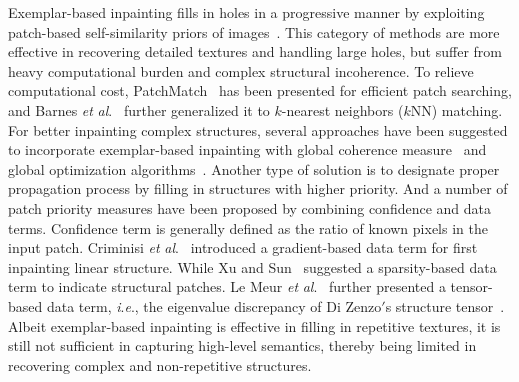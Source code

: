 \documentclass[10pt,journal,compsoc]{IEEEtran}
\newcommand{\ie}{\textit{i}.\textit{e}.}
\newcommand{\etal}{\textit{et} \textit{al}.}
\begin{document}
%


Exemplar-based inpainting fills in holes in a progressive manner by exploiting patch-based self-similarity priors of images~\cite{criminisi2004region,Efros1999iccv}.
%
This category of methods are more effective in recovering detailed textures and handling large holes, but suffer from heavy computational burden and complex structural incoherence.
%
To relieve computational cost, PatchMatch~\cite{Barnes:2009:PAR} has been presented for efficient patch searching, and Barnes \etal~\cite{Barnes2010eccv} further generalized it to $k$-nearest neighbors ($k$NN) matching.
%
%
%
For better inpainting complex structures, several approaches have been suggested to incorporate exemplar-based inpainting with global coherence measure~\cite{wexler2004cvpr,he2012eccv} and global optimization algorithms~\cite{KomodakisPriority,pritch2009iccv}.
%
Another type of solution is to designate proper propagation process by filling in structures with higher priority.
%
And a number of patch priority measures have been proposed by combining confidence and
data terms.
%
Confidence term is generally defined as the ratio of known pixels in the input patch.
%
Criminisi \etal ~\cite{criminisi2004region} introduced a gradient-based data term for first inpainting linear structure.
%
While Xu and Sun~\cite{XuPatchSparsity} suggested a sparsity-based data term to indicate structural patches.
%
Le Meur \etal~\cite{LeMeur2011examplar} further presented a tensor-based data term, \ie, the eigenvalue discrepancy of Di Zenzo$'$s structure tensor~\cite{DiZenzo1986gradient}.
%
Albeit exemplar-based inpainting is effective in filling in repetitive textures, it is still not sufficient in capturing high-level semantics, thereby being limited in recovering complex and non-repetitive structures.






\end{document}
